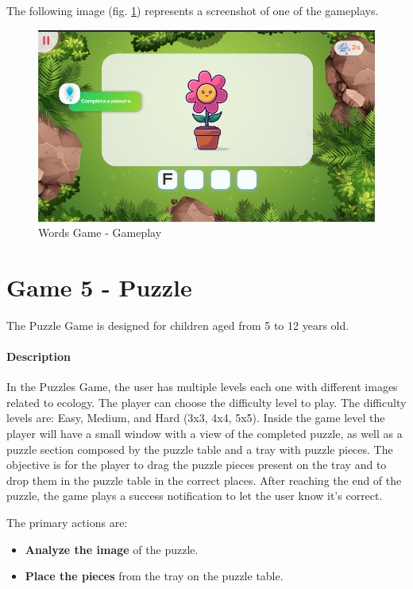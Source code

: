 The following image (fig. \ref{fig:wordsGameplay}) represents a screenshot of one of the gameplays.

\begin{figure}[H]
    \centering
    \includegraphics[scale=0.45]{Chapters/gameplay/WordsGame.jpg}
    \caption{Words Game - Gameplay}
    \label{fig:wordsGameplay}    
\end{figure}

\newpage
\section{Game 5 - Puzzle}

The Puzzle Game is designed for children aged from 5 to 12 years old.

\paragraph{Description}

In the Puzzles Game, the user has multiple levels each one with different images related to ecology. The player can choose the difficulty level to play. The difficulty levels are: Easy, Medium, and Hard (3x3, 4x4, 5x5). Inside the game level the player will have a small window with a view of the completed puzzle, as well as a puzzle section composed by the puzzle table and a tray with puzzle pieces.
The objective is for the player to drag the puzzle pieces present on the tray and to drop them in the puzzle table in the correct places. After reaching the end of the puzzle, the game plays a success notification to let the user know it's correct.

The primary actions are:

\begin{itemize}
    \item \textbf{Analyze the image} of the puzzle.
    \item \textbf{Place the pieces} from the tray on the puzzle table.
\end{itemize}

